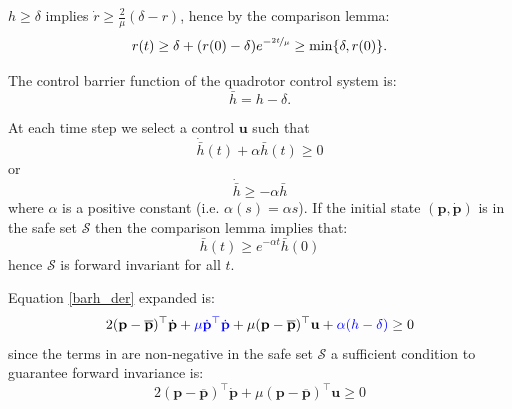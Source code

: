 \documentclass[10pt, a4paper]{report}
\begin{document}
$h\ge \delta$ implies $\dot r\ge\frac{2}{\mu}(\delta-r)$, hence by the comparison lemma:\begin{equation}
    r(t)\ge \delta+(r(0)-\delta)e^{-\nicefrac{2t}{\mu}}\ge\min\{\delta,r(0)\}.
\end{equation} 
\begin{boxdefinition}{}{}
    The control barrier function of the quadrotor control system is:\begin{equation}
        \bar h=h-\delta.
    \end{equation}
\end{boxdefinition}
At each time step we select a control $\mathbf u$ such that\begin{equation}
    \dot{\bar h}(t)+\alpha\bar h(t)\ge 0
\end{equation}
or\begin{equation}\label{barh_der}
    \dot{\bar h}\ge-\alpha\bar h 
\end{equation}
where $\alpha$ is a positive constant (i.e. $\alpha(s)=\alpha s$).
If the initial state $(\mathbf p,\dot{\mathbf p})$ is in the safe set $\mathcal S$ then the comparison lemma implies that:\begin{equation}
    \bar h(t)\ge e^{-\alpha t}\bar h(0)
\end{equation}
hence $\mathcal S$ is forward invariant for all $t$.\bigskip 

\noindent Equation \eqref{barh_der} expanded is:\begin{equation}
    2 (\mathbf{p} - \overline{\mathbf{p}})^\top \dot{\mathbf{p}} + \color{blue}\mu \dot{\mathbf{p}}^\top \dot{\mathbf{p}}\color{black} + \mu (\mathbf{p} - \overline{\mathbf{p}})^\top \mathbf{u} +\color{blue} \alpha(h - \delta)\color{black} \ge 0
\end{equation}
since the terms in  are non-negative in the safe set $\mathcal S$ a sufficient condition to guarantee forward invariance is:\begin{equation}
     2 (\mathbf{p} - \overline{\mathbf{p}})^\top \dot{\mathbf{p}} + \mu (\mathbf{p} - \overline{\mathbf{p}})^\top \mathbf{u} \ge 0
\end{equation}
\end{document}
